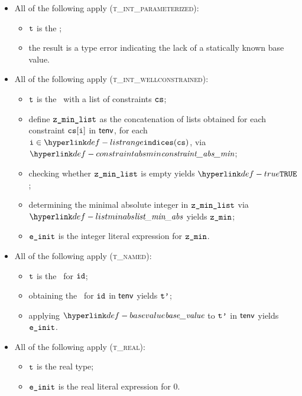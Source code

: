 \begin{itemize}
    \item All of the following apply (\textsc{t\_int\_parameterized}):
    \begin{itemize}
        \item $\texttt{t}$ is the \parameterizedintegertype;
        \item the result is a type error indicating the lack of a statically known base value.
    \end{itemize}

    \item All of the following apply (\textsc{t\_int\_wellconstrained}):
    \begin{itemize}
        \item $\texttt{t}$ is the \wellconstrainedintegertype\ with a list of constraints $\texttt{cs}$;
        \item define $\texttt{z\_min\_list}$ as the concatenation of lists obtained for each
              constraint $\texttt{cs}[\texttt{i}]$ in $\textsf{tenv}$, for each $\vi\in\listrange(\cs)$, via $\constraintabsmin$;
        \item checking whether $\texttt{z\_min\_list}$ is empty yields $\True$\ProseOrTypeError{\BaseValueEmptyType};
        \item determining the minimal absolute integer in $\texttt{z\_min\_list}$ via $\listminabs$ yields $\texttt{z\_min}$;
        \item $\texttt{e\_init}$ is the integer literal expression for $\texttt{z\_min}$.
    \end{itemize}

    \item All of the following apply (\textsc{t\_named}):
    \begin{itemize}
        \item $\texttt{t}$ is the \namedtype\ for $\texttt{id}$;
        \item obtaining the \underlyingtype\ for $\texttt{id}$ in $\textsf{tenv}$ yields $\texttt{t'}$\ProseOrTypeError;
        \item applying $\basevalue$ to $\texttt{t'}$ in $\textsf{tenv}$ yields $\texttt{e\_init}$\ProseOrTypeError.
    \end{itemize}

    \item All of the following apply (\textsc{t\_real}):
    \begin{itemize}
        \item $\texttt{t}$ is the real type;
        \item $\texttt{e\_init}$ is the real literal expression for $0$.
    \end{itemize}


\end{itemize}

